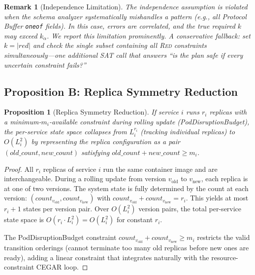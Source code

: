 \documentclass[10pt,twocolumn]{article}
\newtheorem{proposition}[theorem]{Proposition}
\newtheorem{remark}[theorem]{Remark}
\begin{document}
\begin{remark}[Independence Limitation]
The independence assumption is violated when the schema analyzer systematically mishandles a pattern (e.g., all Protocol Buffer \texttt{oneof} fields). In this case, errors are correlated, and the true required $k$ may exceed $k_\alpha$. We report this limitation prominently. A conservative fallback: set $k = |\mathit{red}|$ and check the single subset containing all \textsc{Red} constraints simultaneously---one additional SAT call that answers ``is the plan safe if every uncertain constraint fails?''
\end{remark}

\subsection{Proposition B: Replica Symmetry Reduction}
\label{sec:replica-symmetry}

\begin{proposition}[Replica Symmetry Reduction]
\label{prop:replica}
If service $i$ runs $r_i$ replicas with a minimum-$m_i$-available constraint during rolling update (PodDisruptionBudget), the per-service state space collapses from $L_i^{r_i}$ (tracking individual replicas) to $O(L_i^2)$ by representing the replica configuration as a pair $(\mathit{old\_count}, \mathit{new\_count})$ satisfying $\mathit{old\_count} + \mathit{new\_count} \geq m_i$.
\end{proposition}

\begin{proof}
All $r_i$ replicas of service $i$ run the same container image and are interchangeable. During a rolling update from version $v_{\mathrm{old}}$ to $v_{\mathrm{new}}$, each replica is at one of two versions. The system state is fully determined by the count at each version: $(\mathit{count}_{v_{\mathrm{old}}}, \mathit{count}_{v_{\mathrm{new}}})$ with $\mathit{count}_{v_{\mathrm{old}}} + \mathit{count}_{v_{\mathrm{new}}} = r_i$. This yields at most $r_i + 1$ states per version pair. Over $O(L_i^2)$ version pairs, the total per-service state space is $O(r_i \cdot L_i^2) = O(L_i^2)$ for constant $r_i$.

The PodDisruptionBudget constraint $\mathit{count}_{v_{\mathrm{old}}} + \mathit{count}_{v_{\mathrm{new}}} \geq m_i$ restricts the valid transition orderings (cannot terminate too many old replicas before new ones are ready), adding a linear constraint that integrates naturally with the resource-constraint CEGAR loop.
\end{proof}
\end{document}
